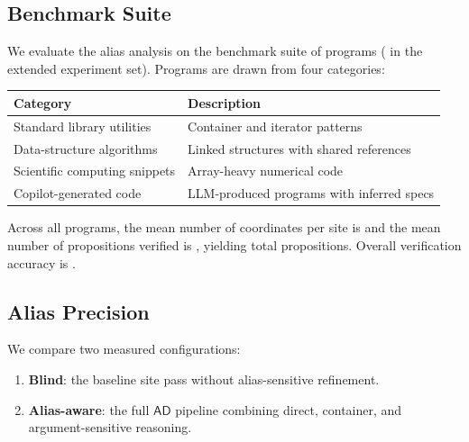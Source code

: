 \documentclass[11pt]{article}
\newcommand{\AD}{\mathsf{AD}}               %
\begin{document}
\subsection{Benchmark Suite}

We evaluate the alias analysis on the \JuGeo{} benchmark suite of
\compTotalPrograms{} programs (\expTotalPrograms{} in the extended
experiment set).  Programs are drawn from four categories:

\begin{center}
\begin{tabular}{ll}
  \toprule
  Category & Description \\
  \midrule
  Standard library utilities & Container and iterator patterns \\
  Data-structure algorithms & Linked structures with shared references \\
  Scientific computing snippets & Array-heavy numerical code \\
  Copilot-generated code & LLM-produced programs with inferred specs \\
  \bottomrule
\end{tabular}
\end{center}

\noindent
Across all programs, the mean number of coordinates per site is
\compCoordsMean{} and the mean number of propositions verified is
\compPropsMean{}, yielding \compPropsSum{} total propositions.
Overall verification accuracy is \compOverallAccuracy{}.

\subsection{Alias Precision}

We compare two measured configurations:
\begin{enumerate}[noitemsep]
  \item \textbf{Blind}: the baseline site pass without alias-sensitive
    refinement.
  \item \textbf{Alias-aware}: the full $\AD$ pipeline combining direct,
    container, and argument-sensitive reasoning.
\end{enumerate}
\end{document}
